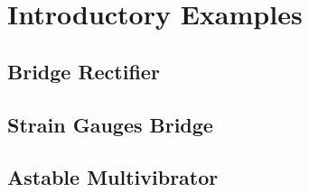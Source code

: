 \section{Introductory Examples}

\subsection{Bridge Rectifier}

\begin{center}
    
\end{center}

\begingroup
  \fontsize{10pt}{12pt}\selectfont
  
\endgroup


\subsection{Strain Gauges Bridge}

\begin{center}
    
\end{center}

\begingroup
  \fontsize{10pt}{12pt}\selectfont
  
\endgroup


\subsection{Astable Multivibrator}

\begin{center}
    
\end{center}

\begingroup
  \fontsize{10pt}{12pt}\selectfont
  
\endgroup
